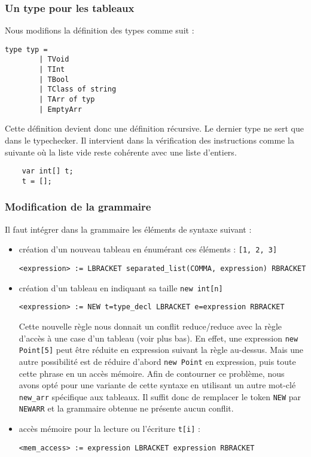 \documentclass{article}
\begin{document}
\subsubsection{Un type pour les tableaux} 
Nous modifions la définition des types comme suit : 
\begin{lstlisting}[style=mystyle]
    type typ =
        | TVoid
        | TInt
        | TBool
        | TClass of string
        | TArr of typ
        | EmptyArr
\end{lstlisting}
Cette définition devient donc une définition récursive.
Le dernier type ne sert que dans le typechecker.
Il intervient dans la vérification des instructions comme la suivante où 
la liste vide reste cohérente avec une liste d'entiers.
\begin{verbatim}
    var int[] t;
    t = [];
\end{verbatim}


\subsubsection{Modification de la grammaire}
Il faut intégrer dans la grammaire les éléments de syntaxe suivant : 
\begin{itemize}
    \item création d'un nouveau tableau en énumérant ces éléments : \texttt{[1, 2, 3]}
            \begin{lstlisting}[style=mystyle]
<expression> := LBRACKET separated_list(COMMA, expression) RBRACKET\end{lstlisting}
    \item création d'un tableau en indiquant sa taille \texttt{new int[n]}
    \begin{lstlisting}[style=mystyle]
<expression> := NEW t=type_decl LBRACKET e=expression RBRACKET\end{lstlisting}
        Cette nouvelle règle nous donnait un conflit reduce/reduce avec la règle d'accès à une case d'un tableau (voir plus bas).
        En effet, une expression \texttt{new Point[5]} peut être réduite en expression suivant la règle au-dessus.
        Mais une autre possibilité est de réduire d'abord \texttt{new Point} en expression, puis toute 
        cette phrase en un accès mémoire.
        Afin de contourner ce problème, nous avons opté pour une variante de cette syntaxe 
        en utilisant un autre mot-clé \texttt{new\_arr} spécifique aux tableaux.
        Il suffit donc de remplacer le token \texttt{NEW} par \texttt{NEWARR} et la grammaire 
        obtenue ne présente aucun conflit.
    \item accès mémoire pour la lecture ou l'écriture \texttt{t[i]} : 
    \begin{lstlisting}[style=mystyle]
<mem_access> := expression LBRACKET expression RBRACKET\end{lstlisting}
    \end{itemize}
\end{document}
